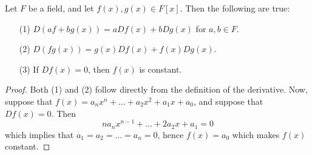 \begin{proposition}\label{proposition_8.6.1}
  Let $F$ be a field, and let $f(x),g(x) \in F[x]$. Then the following
  are true:
  \begin{enumerate}
    \item[(1)] $D{(af+bg(x))}=aD{f(x)}+bD{g(x)}$ for $a,b \in F$.

    \item[(2)] $D{(fg(x))}=g(x)D{f(x)}+f(x)D{g(x)}$.

    \item[(3)] If $D{f(x)}=0$, then $f(x)$ is constant.
  \end{enumerate}
\end{proposition}
\begin{proof}
  Both (1) and (2) follow directly from the definition of the
  derivative. Now, suppose that $f(x)=a_nx^n+\dots+a_2x^2+a_1x+a_0$,
  and suppose that $D{f(x)}=0$. Then
  \begin{equation*}
    na_nx^{n-1}+\dots+2a_2x+a_1=0
  \end{equation*}
  which implies that $a_1=a_2=\dots=a_n=0$, hence $f(x)=a_0$ which
  makes $f(x)$ constant.
\end{proof}

